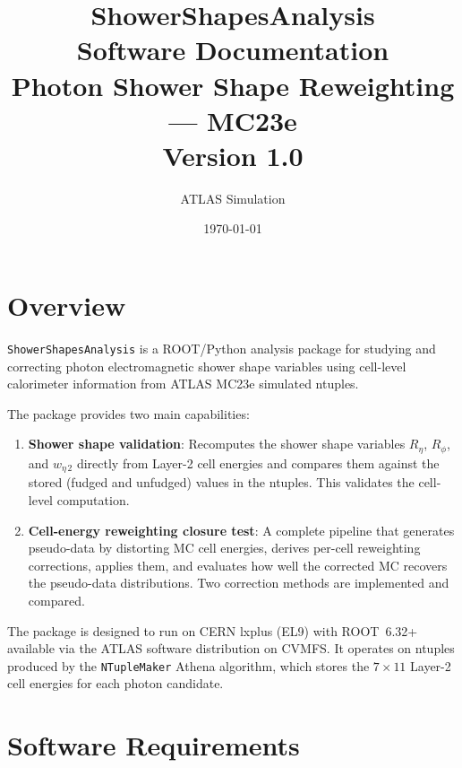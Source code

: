 \documentclass[12pt,a4paper]{article}
\title{%
  \textbf{ShowerShapesAnalysis}\\[6pt]
  \large Software Documentation\\[4pt]
  \large Photon Shower Shape Reweighting — MC23e\\[4pt]
  \normalsize Version 1.0
}
\author{ATLAS Simulation}
\date{\today}
\begin{document}
\maketitle
\thispagestyle{fancy}

\tableofcontents
\clearpage

\section{Overview}
\label{sec:overview}

\texttt{ShowerShapesAnalysis} is a ROOT/Python analysis package for
studying and correcting photon electromagnetic shower shape variables
using cell-level calorimeter information from ATLAS MC23e simulated
ntuples.

The package provides two main capabilities:

\begin{enumerate}[leftmargin=2em]
  \item \textbf{Shower shape validation}: Recomputes the shower shape
    variables $R_\eta$, $R_\phi$, and $w_{\eta\,2}$ directly from
    Layer-2 cell energies and compares them against the stored (fudged
    and unfudged) values in the ntuples. This validates the cell-level
    computation.

  \item \textbf{Cell-energy reweighting closure test}: A complete
    pipeline that generates pseudo-data by distorting MC cell energies,
    derives per-cell reweighting corrections, applies them, and
    evaluates how well the corrected MC recovers the pseudo-data
    distributions. Two correction methods are implemented and compared.
\end{enumerate}

The package is designed to run on CERN lxplus (EL9) with ROOT~6.32+
available via the ATLAS software distribution on CVMFS. It operates on
ntuples produced by the \texttt{NTupleMaker} Athena algorithm, which
stores the $7\times11$ Layer-2 cell energies for each photon candidate.

\section{Software Requirements}
\label{sec:requirements}
\end{document}
